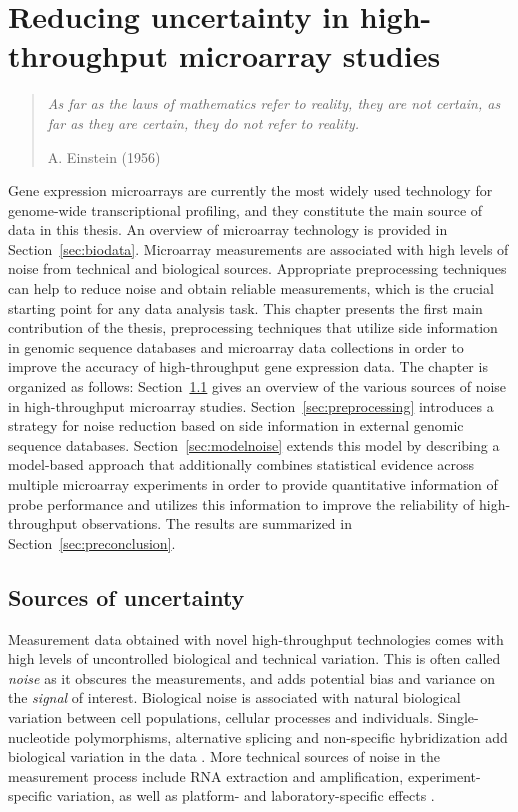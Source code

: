 \chapter{Reducing uncertainty in high-throughput microarray studies}
\label{ch:preproc} 

\begin{quotation}
  \emph{As far as the laws of mathematics refer to reality, they are
    not certain, as far as they are certain, they do not refer to
    reality.}
\begin{flushright}
A. Einstein (1956)
\end{flushright}
\end{quotation}

Gene expression microarrays are currently the most widely used
technology for genome-wide transcriptional profiling, and they
constitute the main source of data in this thesis. An overview of
microarray technology is provided in
Section~\ref{sec:biodata}. Microarray measurements are associated with
high levels of noise from technical and biological
sources. Appropriate preprocessing techniques can help to reduce noise
and obtain reliable measurements, which is the crucial starting point
for any data analysis task. This chapter presents the first main
contribution of the thesis, preprocessing techniques that utilize side
information in genomic sequence databases and microarray data collections in order to improve the accuracy
of high-throughput gene expression data. The chapter is organized as follows: Section~\ref{sec:noise} gives an overview of the various sources of noise in high-throughput microarray studies. Section~\ref{sec:preprocessing} introduces a strategy for noise reduction based on side information in external genomic sequence databases. Section~\ref{sec:modelnoise} extends this model by describing a model-based approach that additionally combines statistical evidence across multiple microarray experiments in order to provide quantitative information of probe performance and utilizes this information to improve the reliability of high-throughput observations. The results are summarized in Section~\ref{sec:preconclusion}.


\section{Sources of uncertainty}\label{sec:noise}

Measurement data obtained with novel high-throughput technologies
comes with high levels of uncontrolled biological and technical
variation. This is often called {\it noise} as it obscures the
measurements, and adds potential bias and variance on the {\it signal}
of interest. Biological noise is associated with natural biological
variation between cell populations, cellular processes and
individuals.  Single-nucleotide polymorphisms, alternative splicing
and non-specific hybridization add biological variation in the data
\citep{Dai05,Zhang05}. More technical sources of noise in the
measurement process include RNA extraction and amplification,
experiment-specific variation, as well as platform- and
laboratory-specific effects \citep{Choi03, Shi06,Tu02}.


